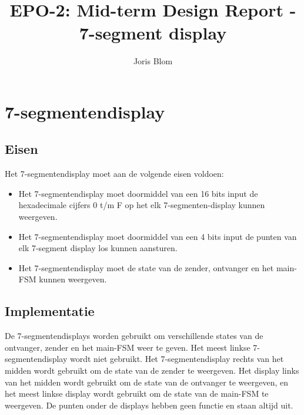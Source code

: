 \documentclass{report}
\title{EPO-2: Mid-term Design Report - 7-segment display}
\author{Joris Blom}
\begin{document}
\chapter{7-segmentendisplay}
\label{ch:sseg}
\section{Eisen}
\label{sec:Eisen}
Het 7-segmentendisplay moet aan de volgende eisen voldoen: 
\begin{itemize}
\item Het 7-segmentendisplay moet doormiddel van een 16 bits input de hexadecimale cijfers 0 t/m F op het elk 7-segmenten-display kunnen weergeven.
\item Het 7-segmentendisplay moet doormiddel van een 4 bits input de punten van elk 7-segment display los kunnen aansturen.
\item Het 7-segmentendisplay moet de state van de zender, ontvanger en het main-FSM kunnen weergeven.
\end{itemize}

\section{Implementatie}
De 7-segmentendisplays worden gebruikt om verschillende states van de ontvanger, zender en het main-FSM weer te geven. Het meest linkse 7-segmentendisplay wordt niet gebruikt. Het 7-segmentendisplay rechts van het midden wordt gebruikt om de state van de zender te weergeven. Het display links van het midden wordt gebruikt om de state van de ontvanger te weergeven, en het meest linkse display wordt gebruikt om de state van de main-FSM te weergeven. De punten onder de displays hebben geen functie en staan altijd uit.
\newpage
\end{document}
